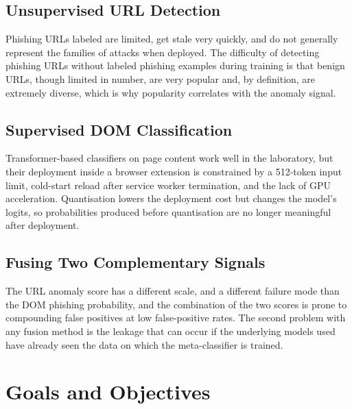 \documentclass{FastFyp}
\begin{document}
\subsection{Unsupervised URL Detection}
Phishing URLs labeled are limited, get stale very quickly, and do not generally represent the families of attacks when deployed. The difficulty of detecting phishing URLs without labeled phishing examples during training is that benign URLs, though limited in number, are very popular and, by definition, are extremely diverse, which is why popularity correlates with the anomaly signal.

\subsection{Supervised DOM Classification}
Transformer-based classifiers on page content work well in the laboratory, but their deployment inside a browser extension is constrained by a 512-token input limit, cold-start reload after service worker termination, and the lack of GPU acceleration. Quantisation lowers the deployment cost but changes the model's logits, so probabilities produced before quantisation are no longer meaningful after deployment.

\subsection{Fusing Two Complementary Signals}
The URL anomaly score has a different scale, and a different failure mode than the DOM phishing probability, and the combination of the two scores is prone to compounding false positives at low false-positive rates. The second problem with any fusion method is the leakage that can occur if the underlying models used have already seen the data on which the meta-classifier is trained.

\section{Goals and Objectives}
\end{document}
